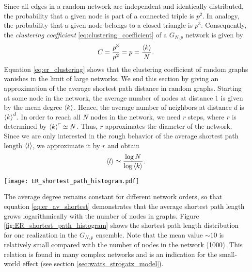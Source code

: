 Since all edges in a random network are independent and identically distributed, the probability that a given node is part of a connected triple is $p^2$.
In analogy, the probability that a given node belongs to a closed triangle is $p^3$.
Consequently, the \emph{clustering coefficient}  \eqref{eq:clustering_coefficient} of a $G_{N,p}$ network is given by
\begin{equation}\label{eq:er_clustering}
C=\frac{p^3}{p^2}=p=\frac{\left< k \right>}{N}.
\end{equation}
Equation \eqref{eq:er_clustering} shows that the clustering coefficient of random graphs vanishes in the limit of large networks.
We end this section by giving an approximation of the average shortest path distance in random graphs. 
Starting at some node in the network, the average number of nodes at distance 1 is given by the mean degree $\left< k \right>$. 
Hence, the average number of neighbors at distance $d$ is $\left< k \right>^d$.
In order to reach all $N$ nodes in the network, we need $r$ steps, where $r$ is determined by $\left< k \right>^r\simeq N$.
Thus, $r$ approximates the diameter of the network.
Since we are only interested in the rough behavior of the average shortest path length $\left< l \right>$, we approximate it by $r$ \citep{dynamical_processes} and obtain 
\begin{equation}\label{eq:er_av_shortest}
\left< l \right>\simeq \frac{\log N}{\log \left< k \right>}.
\end{equation}
%
\begin{SCfigure}
\texttt{[image: ER\_shortest\_path\_histogram.pdf]}
\caption{Shortest path length distribution for a realization of a directed \ER network of the ensemble $G_{N,p}$ for $N=1000$ and $p=0.002$.
Equation \eqref{eq:er_av_shortest} gives a mean value of $8.18$, while the computed value is $9.08$.
The discrepancy vanishes in the limit of infinite graphs $N\rightarrow \infty$.
The maximum shortest path length is $18$ in this example.
It defines the diameter of the network.}
\label{fig:ER_shortest_path_histogram}
\end{SCfigure}
%
The average degree remains constant for different network orders, so that equation \eqref{eq:er_av_shortest} demonstrates that the average shortest path length grows logarithmically with the number of nodes in \ER graphs.
Figure \ref{fig:ER_shortest_path_histogram} shows the shortest path length distribution for one realization in the $G_{N,p}$ ensemble.
Note that the mean value $\sim 10$ is relatively small compared with the number of nodes in the network (1000).
This relation is found in many complex networks and is an indication for the small-world effect (see section \ref{sec:watts_strogatz_model}).

